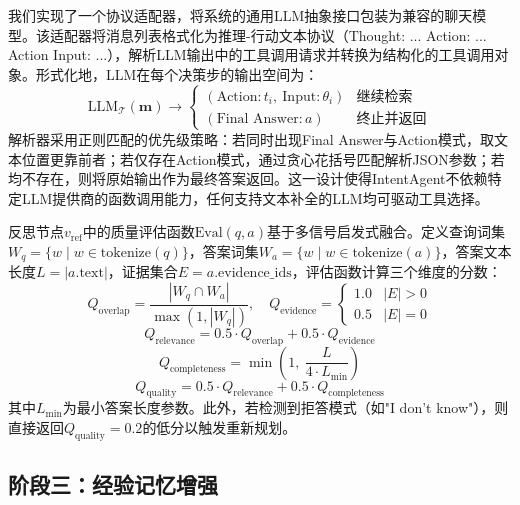 \documentclass[runningheads]{llncs}
\begin{document}
我们实现了一个协议适配器，将系统的通用LLM抽象接口包装为兼容的聊天模型。该适配器将消息列表格式化为推理-行动文本协议（Thought: ... Action: ... Action Input: ...），解析LLM输出中的工具调用请求并转换为结构化的工具调用对象。形式化地，LLM在每个决策步的输出空间为：
\begin{equation}
    \text{LLM}_{\mathcal{T}}(\mathbf{m}) \to \begin{cases}
    (\text{Action}: t_i,\ \text{Input}: \theta_i) & \text{继续检索} \\
    (\text{Final Answer}: a) & \text{终止并返回}
    \end{cases}
\end{equation}
解析器采用正则匹配的优先级策略：若同时出现Final Answer与Action模式，取文本位置更靠前者；若仅存在Action模式，通过贪心花括号匹配解析JSON参数；若均不存在，则将原始输出作为最终答案返回。这一设计使得IntentAgent不依赖特定LLM提供商的函数调用能力，任何支持文本补全的LLM均可驱动工具选择。

反思节点$v_{\text{ref}}$中的质量评估函数$\text{Eval}(q, a)$基于多信号启发式融合。定义查询词集$W_q = \{w \mid w \in \text{tokenize}(q)\}$，答案词集$W_a = \{w \mid w \in \text{tokenize}(a)\}$，答案文本长度$L = |a.\text{text}|$，证据集合$E = a.\text{evidence\_ids}$，评估函数计算三个维度的分数：
\begin{equation}
    Q_{\text{overlap}} = \frac{|W_q \cap W_a|}{\max(1, |W_q|)}, \quad Q_{\text{evidence}} = \begin{cases} 1.0 & |E| > 0 \\ 0.5 & |E| = 0 \end{cases}
\end{equation}
\begin{equation}
    Q_{\text{relevance}} = 0.5 \cdot Q_{\text{overlap}} + 0.5 \cdot Q_{\text{evidence}}
\end{equation}
\begin{equation}
    Q_{\text{completeness}} = \min\!\left(1,\ \frac{L}{4 \cdot L_{\min}}\right)
\end{equation}
\begin{equation}
    Q_{\text{quality}} = 0.5 \cdot Q_{\text{relevance}} + 0.5 \cdot Q_{\text{completeness}}
\end{equation}
其中$L_{\min}$为最小答案长度参数。此外，若检测到拒答模式（如"I don't know"），则直接返回$Q_{\text{quality}} = 0.2$的低分以触发重新规划。

\subsection{阶段三：经验记忆增强}
\end{document}
